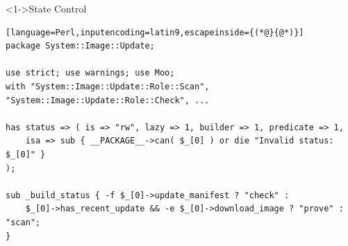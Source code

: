 \documentclass[ngerman,xcolor={table,dvipsnames},smaller,compress,hyperref={bookmarks,colorlinks},handout]{beamer}%
\begin{document}
\begin{frame}[t,fragile]

\begin{block}<1->{State Control}
\scriptsize
\begin{lstlisting}[language=Perl,inputencoding=latin9,escapeinside={(*@}{@*)}]
package System::Image::Update;

use strict; use warnings; use Moo;
with "System::Image::Update::Role::Scan", "System::Image::Update::Role::Check", ...

has status => ( is => "rw", lazy => 1, builder => 1, predicate => 1,
    isa => sub { __PACKAGE__->can( $_[0] ) or die "Invalid status: $_[0]" }
);

sub _build_status { -f $_[0]->update_manifest ? "check" :
    $_[0]->has_recent_update && -e $_[0]->download_image ? "prove" : "scan";
}
\end{lstlisting}
\end{block}

\begin{itemize}
\end{itemize}

\end{frame}
\end{document}
